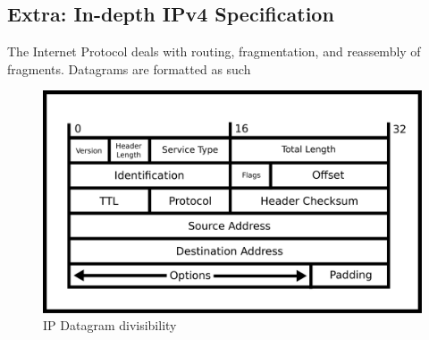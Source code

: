 \subsection{Extra: In-depth IPv4 Specification}

The Internet Protocol deals with routing, fragmentation, and reassembly of fragments.
Datagrams are formatted as such

\begin{figure}[H]
  \centering
\includegraphics[width=.8\textwidth]{networking/drawings/ip_datagram.eps}
\caption{IP Datagram divisibility}
\end{figure}


